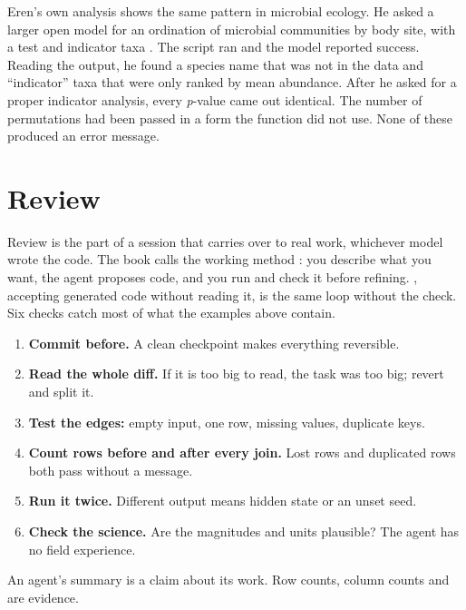 \documentclass[11pt,a4paper]{article}
\begin{document}
Eren's own analysis shows the same pattern in microbial ecology. He asked a
larger open model for an ordination of microbial communities by body site,
with a test and indicator taxa \parencite{eren2026agenticcoding}. The script
ran and the model reported success. Reading the output, he found a species
name that was not in the data and ``indicator'' taxa that were only ranked
by mean abundance. After he asked for a proper indicator analysis, every
\emph{p}-value came out identical. The number of permutations had been passed
in a form the function did not use. None of these produced an error message.

\section{Review}
\label{sec:review}

Review is the part of a session that carries over to real work, whichever
model wrote the code. The book calls the working method : you describe what you want, the agent proposes code, and you
run and check it before refining. , accepting generated
code without reading it, is the same loop without the check. Six checks catch
most of what the examples above contain.

\begin{enumerate}
  \item \textbf{Commit before.} A clean checkpoint makes everything
    reversible.
  \item \textbf{Read the whole diff.} If it is too big to read, the task was
    too big; revert and split it.
  \item \textbf{Test the edges:} empty input, one row, missing values,
    duplicate keys.
  \item \textbf{Count rows before and after every join.} Lost rows and
    duplicated rows both pass without a message.
  \item \textbf{Run it twice.} Different output means hidden state or an
    unset seed.
  \item \textbf{Check the science.} Are the magnitudes and units plausible?
    The agent has no field experience.
\end{enumerate}

\begin{keypoint}
An agent's summary is a claim about its work. Row counts, column counts and
 are evidence.
\end{keypoint}
\end{document}
